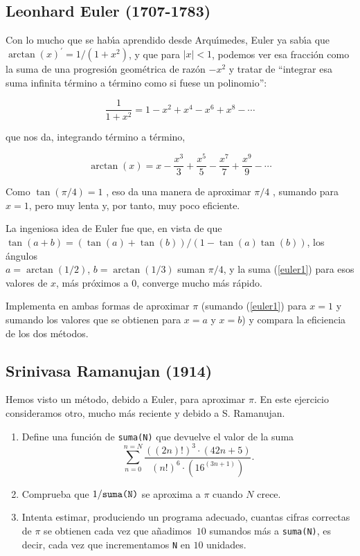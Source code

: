 



\subsection{Leonhard Euler (1707-1783)}

Con lo mucho que se hab\'{\i}a aprendido desde Arqu\'{\i}medes, Euler ya
sab\'{\i}a que
$\arctan(x)^{\prime} = 1/(1+x^2)$,
y que para $|x|<1$, podemos ver esa fracci\'on como la suma de una progresi\'on
geom\'etrica de raz\'on $-x^2$ 
y tratar de  ``integrar esa suma infinita t\'ermino a t\'ermino como si fuese un
polinomio'':

\[\frac{1}{1+x^2} = 1-x^2+x^4-x^6+x^8-\cdots\]

\noindent que nos da, integrando t\'ermino a t\'ermino, 

\begin{equation}\label{euler1}
\arctan(x) = x -\dfrac{x^3}{3} +\dfrac{x^5}{5}-\dfrac{x^7}{7}
+\dfrac{x^9}{9} -\cdots
\end{equation}

Como $\tan(\pi/4) = 1$ , eso da una manera de aproximar $\pi/4$ , sumando para
$x=1$, pero muy lenta y, por tanto, muy poco eficiente.

La ingeniosa idea de Euler fue que, en vista de que \quad 
$\tan(a+b) = (\tan(a)+\tan(b))/(1-\tan(a)\tan(b))$,
los \'angulos\\ $a=\arctan(1/2)$, $b=\arctan(1/3)$ suman $\pi/4$, y la suma
(\ref{euler1}) 
para esos valores de $x$, m\'as pr\'oximos a $0$,  converge mucho m\'as
r\'apido.
\
\smallskip
\

\begin{ejer}

Implementa en {\sage}   ambas formas de aproximar $\pi$ (sumando
(\ref{euler1}) para $x=1$ y sumando los valores que se obtienen para $x=a$ y
$x=b$) y compara la eficiencia de los dos m\'etodos.
\end{ejer}
\subsection{Srinivasa Ramanujan (1914)}
Hemos visto un m\'etodo, debido a Euler, para aproximar $\pi$. En este
ejercicio consideramos otro, mucho
m\'as reciente y debido a S. Ramanujan.

\begin{ejer}

\begin{enumerate}
\item Define una funci\'on de  {\sage}  {\tt suma(N)} que devuelve el valor de
la
suma
\[\sum_{n=0}^{n=N}\frac{((2n)!)^3\cdot (42n+5)}{(n!)^6\cdot (16^{(3n+1)})}.\]
\item Comprueba que $1/\text{\tt suma(N)}$ se aproxima a $\pi$ cuando $N$ crece.
\item Intenta estimar, produciendo un programa adecuado, cuantas cifras
correctas de $\pi$ se obtienen cada vez que a\~nadimos~$10$ sumandos m\'as a 
{\tt suma(N)}, es decir, cada vez que incrementamos {\tt N} en $10$ unidades.
\end{enumerate}
\end{ejer}
